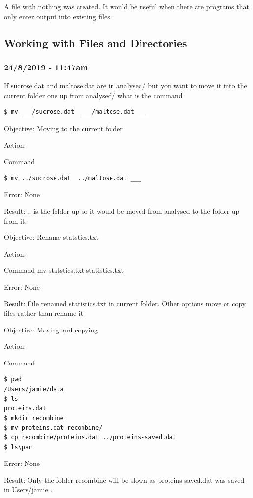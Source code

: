 \documentclass{article}
\begin{document}
A file with nothing was created. It would be useful when there are programs that only enter output into existing files.

\subsection{Working with Files and Directories}
\subsubsection*{24/8/2019 - 11:47am}

If sucrose.dat and maltose.dat are in analysed/ but you want to move it into the current folder one up from analysed/ what is the command

\begin{verbatim}$ mv ___/sucrose.dat  ___/maltose.dat ___\end{verbatim}

Objective: Moving to the current folder\par
Action:\par
Command \begin{verbatim}$ mv ../sucrose.dat  ../maltose.dat ___\end{verbatim} \par
Error: None\par
Result: .. is the folder up so it would be moved from analysed to the folder up from it.\par


Objective: Rename statstics.txt\par
Action:\par
Command mv statstics.txt statistics.txt\par
Error: None \par
Result: File renamed statistics.txt in current folder. Other options move or copy files rather than rename it.\par

Objective: Moving and copying\par
Action:\par
Command \begin{verbatim}$ pwd
/Users/jamie/data
$ ls
proteins.dat
$ mkdir recombine
$ mv proteins.dat recombine/
$ cp recombine/proteins.dat ../proteins-saved.dat
$ ls\par\end{verbatim}
Error: None \par
Result: Only the folder recombine will be slown as proteins-saved.dat was saved in Users/jamie .\par
\end{document}
